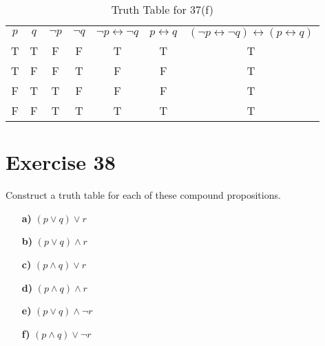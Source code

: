 \documentclass{Axon}
\begin{document}
\begin{table}[ht]
    \centering
    \begin{tabular}{c|c|c|c|c|c|c}
        \(p\) & \(q\) & \(\lnot p\) & \(\lnot q\) & \(\lnot p \leftrightarrow \lnot q\) & \(p \leftrightarrow q\) & \((\lnot p \leftrightarrow \lnot q) \leftrightarrow (p \leftrightarrow q)\) \\
        T     & T     & F           & F           & T                                   & T                       & T                                                                           \\
        T     & F     & F           & T           & F                                   & F                       & T                                                                           \\
        F     & T     & T           & F           & F                                   & F                       & T                                                                           \\
        F     & F     & T           & T           & T                                   & T                       & T
    \end{tabular}
    \caption{Truth Table for 37(f)}
\end{table}

\section*{Exercise 38}
Construct a truth table for each of these compound propositions.
\begin{enumerate}
    \item[\textbf{a)}] \((p \lor q) \lor r\)
    \item[\textbf{b)}] \((p \lor q) \land r\)
    \item[\textbf{c)}] \((p \land q) \lor r\)
    \item[\textbf{d)}] \((p \land q) \land r\)
    \item[\textbf{e)}] \((p \lor q) \land \lnot r\)
    \item[\textbf{f)}] \((p \land q) \lor \lnot r\)
\end{enumerate}
\end{document}
